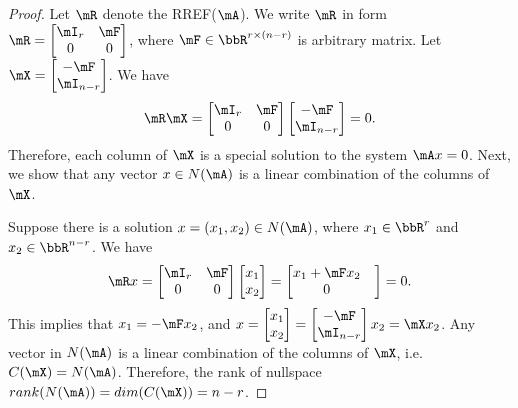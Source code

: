 \documentclass[11pt]{article}
\theoremstyle{plain}
\theoremstyle{definition}
\begin{document}
\begin{proof} Let $\mR$ denote the RREF($\mA$).  We write $\mR$  in form $\mR = \begin{bmatrix} \mI_r & \mF \\ 0 & 0	\end{bmatrix}$, where $\mF \in \bbR^{ r \times (n-r)}$ is arbitrary matrix.
Let $\mX = \begin{bmatrix} -\mF \\ \mI_{n-r}	\end{bmatrix}$.  We have 
\begin{align}
	\mR \mX = \begin{bmatrix} \mI_r & \mF \\ 0 & 0	\end{bmatrix} \begin{bmatrix} -\mF \\ \mI_{n-r}	\end{bmatrix} = 0.
\end{align}
Therefore, each column of $\mX$ is a special solution to the system $\mA x = 0$. Next, we show that any vector $ x \in N(\mA)$ is a linear combination of the columns of $\mX$.

Suppose there is a solution $x = (x_1, x_2) \in N(\mA)$, where $x_1 \in \bbR^{r}$ and $x_2 \in \bbR^{n-r}$. We have 
\begin{align}
	\mR x = \begin{bmatrix} \mI_r & \mF \\ 0 & 0	\end{bmatrix} \begin{bmatrix} x_1 \\ x_2	\end{bmatrix} = \begin{bmatrix} x_1 + \mF x_2 \\  0 &\end{bmatrix} = 0.
\end{align}
This implies that $x_1  = -\mF x_2$, and $x = \begin{bmatrix} x_1 \\ x_2	\end{bmatrix} = \begin{bmatrix} -\mF \\ \mI_{n-r}	\end{bmatrix} x_2 = \mX x_2$. Any vector  in $ N(\mA)$ is a linear combination of the columns of $\mX$, i.e. $C(\mX) = N(\mA)$. Therefore, the rank of nullspace $rank(N(\mA)) = dim(C(\mX)) = n-r$.
\end{proof}
\end{document}
